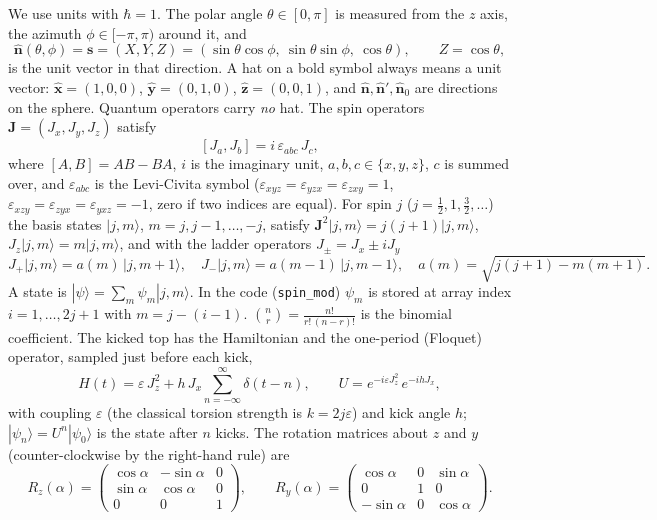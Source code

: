 \documentclass[11pt,a4paper]{article}
\newcommand{\vs}{\bm{s}}
\newcommand{\vJ}{\bm{J}}
\newcommand{\vn}{\hat{\bm n}}
\begin{document}
We use units with $\hbar = 1$. The polar angle $\theta\in[0,\pi]$ is measured from the $z$ axis, the azimuth
$\phi\in[-\pi,\pi)$ around it, and
\begin{equation}\label{eq:unit}
  \vn(\theta,\phi) = \vs = (X, Y, Z) = (\sin\theta\cos\phi,\ \sin\theta\sin\phi,\ \cos\theta), \qquad Z = \cos\theta,
\end{equation}
is the unit vector in that direction. A hat on a bold symbol always means a unit vector: $\hat{\bm x}=(1,0,0)$,
$\hat{\bm y}=(0,1,0)$, $\hat{\bm z}=(0,0,1)$, and $\vn,\vn',\vn_0$ are directions on the sphere. Quantum operators carry
\emph{no} hat. The spin operators $\vJ = (J_x,J_y,J_z)$ satisfy
\begin{equation}\label{eq:comm}
  [J_a, J_b] = i\,\varepsilon_{abc}\,J_c ,
\end{equation}
where $[A,B] = AB-BA$, $i$ is the imaginary unit, $a,b,c\in\{x,y,z\}$, $c$ is summed over, and $\varepsilon_{abc}$ is the
Levi-Civita symbol ($\varepsilon_{xyz}=\varepsilon_{yzx}=\varepsilon_{zxy}=1$, $\varepsilon_{xzy}=\varepsilon_{zyx}=\varepsilon_{yxz}=-1$,
zero if two indices are equal). For spin $j$ ($j = \frac12, 1, \frac32,\dots$) the basis states $|j,m\rangle$,
$m = j, j-1,\dots,-j$, satisfy $\vJ^2|j,m\rangle = j(j+1)|j,m\rangle$, $J_z|j,m\rangle = m|j,m\rangle$, and with
the ladder operators $J_\pm = J_x \pm iJ_y$
\begin{equation}\label{eq:ladder}
  J_+|j,m\rangle = a(m)\,|j,m+1\rangle,\quad J_-|j,m\rangle = a(m-1)\,|j,m-1\rangle,\quad a(m) = \sqrt{j(j+1)-m(m+1)} .
\end{equation}
A state is $|\psi\rangle = \sum_m \psi_m|j,m\rangle$. In the code (\texttt{spin\_mod}) $\psi_m$ is stored at array
index $i = 1,\dots,2j+1$ with $m = j-(i-1)$. $\binom{n}{r} = \frac{n!}{r!\,(n-r)!}$ is the binomial coefficient.
The kicked top has the Hamiltonian and the one-period (Floquet) operator, sampled just before each kick,
\begin{equation}\label{eq:H}
  H(t) = \varepsilon\,J_z^2 + h\,J_x\sum_{n=-\infty}^{\infty}\delta(t-n),\qquad
  U = e^{-i\varepsilon J_z^2}\,e^{-ihJ_x},
\end{equation}
with coupling $\varepsilon$ (the classical torsion strength is $k = 2j\varepsilon$) and kick angle $h$; $|\psi_n\rangle = U^n|\psi_0\rangle$ is the state after $n$ kicks.
The rotation matrices about $z$ and $y$ (counter-clockwise by the right-hand rule) are
\begin{equation}\label{eq:rot}
  R_z(\alpha) = \begin{pmatrix} \cos\alpha & -\sin\alpha & 0\\ \sin\alpha & \cos\alpha & 0 \\ 0 & 0 & 1 \end{pmatrix},
  \qquad
  R_y(\alpha) = \begin{pmatrix} \cos\alpha & 0 & \sin\alpha\\ 0 & 1 & 0 \\ -\sin\alpha & 0 & \cos\alpha \end{pmatrix}.
\end{equation}
\end{document}
